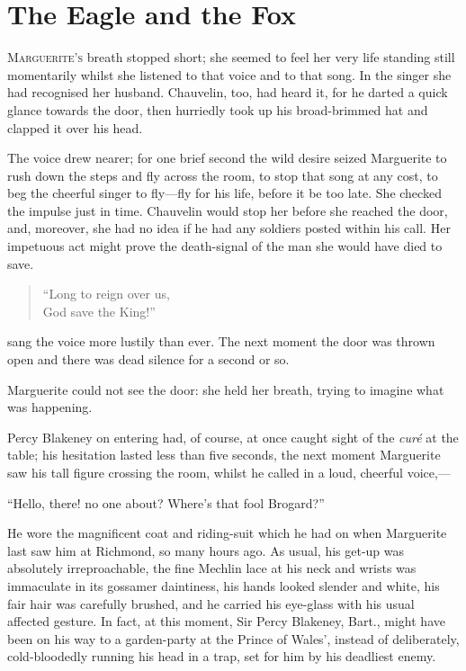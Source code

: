 
\chapter{The Eagle and the Fox}
\lettrine[lines=4]{M}{arguerite's} breath stopped short; she seemed to feel her very life standing still momentarily whilst she listened to that voice and to that song. In the singer she had recognised her husband. Chauvelin, too, had heard it, for he darted a quick glance towards the door, then hurriedly took up his broad-brimmed hat and clapped it over his head.

The voice drew nearer; for one brief second the wild desire seized Marguerite to rush down the steps and fly across the room, to stop that song at any cost, to beg the cheerful singer to fly---fly for his life, before it be too late. She checked the impulse just in time. Chauvelin would stop her before she reached the door, and, moreover, she had no idea if he had any soldiers posted within his call. Her impetuous act might prove the death-signal of the man she would have died to save.

\blockquote{
\enquote{Long to reign over us,\\
God save the King!}
}

sang the voice more lustily than ever. The next moment the door was thrown open and there was dead silence for a second or so.

Marguerite could not see the door: she held her breath, trying to imagine what was happening.

Percy Blakeney on entering had, of course, at once caught sight of the \textit{curé} at the table; his hesitation lasted less than five seconds, the next moment Marguerite saw his tall figure crossing the room, whilst he called in a loud, cheerful voice,---

\enquote{Hello, there! no one about? Where's that fool Brogard?}

He wore the magnificent coat and riding-suit which he had on when Marguerite last saw him at Richmond, so many hours ago. As usual, his get-up was absolutely irreproachable, the fine Mechlin lace at his neck and wrists was immaculate in its gossamer daintiness, his hands looked slender and white, his fair hair was carefully brushed, and he carried his eye-glass with his usual affected gesture. In fact, at this moment, Sir Percy Blakeney, Bart., might have been on his way to a garden-party at the Prince of Wales’, instead of deliberately, cold-bloodedly running his head in a trap, set for him by his deadliest enemy.

